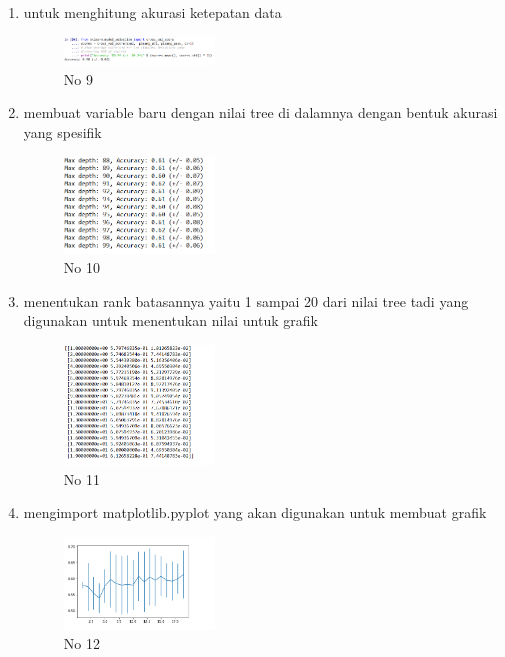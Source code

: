 \begin{enumerate}
            \item untuk menghitung akurasi ketepatan data
            \hfill \break 
            \begin{figure}[H]
                \includegraphics[width=4cm]{figures/1174040/chapter2/9.png}
                \centering
                \caption{No 9}
            \end{figure}

            \item membuat variable baru dengan nilai tree di dalamnya dengan bentuk akurasi yang spesifik
            \hfill \break 
            \begin{figure}[H]
                \includegraphics[width=4cm]{figures/1174040/chapter2/10.png}
                \centering
                \caption{No 10}
            \end{figure}

            \item menentukan rank batasannya yaitu 1 sampai 20 dari nilai tree tadi yang digunakan untuk menentukan nilai untuk grafik
            \hfill \break 
            \begin{figure}[H]
                \includegraphics[width=4cm]{figures/1174040/chapter2/11.png}
                \centering
                \caption{No 11}
            \end{figure}

            \item mengimport matplotlib.pyplot yang akan digunakan untuk membuat grafik
            \hfill \break 
            \begin{figure}[H]
                \includegraphics[width=4cm]{figures/1174040/chapter2/12.png}
                \centering
                \caption{No 12}
            \end{figure}
        \end{enumerate}
